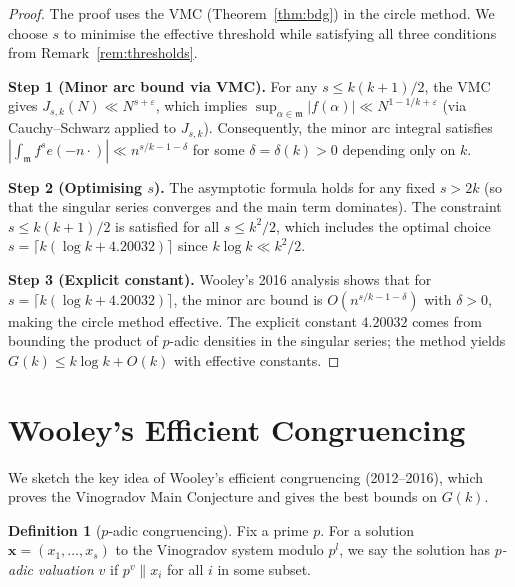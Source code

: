 \documentclass[12pt,a4paper]{amsart}
\theoremstyle{definition}
\newtheorem{definition}[theorem]{Definition}
\begin{document}
\begin{proof}
  The proof uses the VMC (Theorem~\ref{thm:bdg}) in the circle method.
  We choose $s$ to minimise the effective threshold while satisfying all
  three conditions from Remark~\ref{rem:thresholds}.

  \textbf{Step 1 (Minor arc bound via VMC).}
  For any $s \leq k(k+1)/2$, the VMC gives
  $J_{s,k}(N) \ll N^{s+\varepsilon}$, which implies
  $\sup_{\alpha \in \mathfrak{m}} |f(\alpha)| \ll N^{1-1/k+\varepsilon}$
  (via Cauchy--Schwarz applied to $J_{s,k}$).  Consequently, the minor arc
  integral satisfies $|\int_{\mathfrak{m}} f^s e(-n\cdot)| \ll n^{s/k-1-\delta}$
  for some $\delta = \delta(k) > 0$ depending only on $k$.

  \textbf{Step 2 (Optimising $s$).}
  The asymptotic formula holds for any fixed $s > 2k$ (so that the
  singular series converges and the main term dominates).
  The constraint $s \leq k(k+1)/2$ is satisfied for all $s \leq k^2/2$,
  which includes the optimal choice $s = \lceil k(\log k + 4.20032)\rceil$
  since $k \log k \ll k^2/2$.

  \textbf{Step 3 (Explicit constant).}
  Wooley's 2016 analysis \cite{Wooley2016} shows that for
  $s = \lceil k(\log k + 4.20032)\rceil$, the minor arc bound is
  $O(n^{s/k-1-\delta})$ with $\delta > 0$, making the circle method effective.
  The explicit constant $4.20032$ comes from bounding the product of
  $p$-adic densities in the singular series; the method yields
  $G(k) \leq k\log k + O(k)$ with effective constants.
\end{proof}

\section{Wooley's Efficient Congruencing}
\label{sec:efficient}

We sketch the key idea of Wooley's efficient congruencing (2012--2016),
which proves the Vinogradov Main Conjecture and gives the best bounds on $G(k)$.

\begin{definition}[$p$-adic congruencing]
  Fix a prime $p$.  For a solution $\mathbf{x} = (x_1,\ldots,x_s)$ to
  the Vinogradov system modulo $p^l$, we say the solution has
  \emph{$p$-adic valuation} $v$ if $p^v \| x_i$ for all $i$ in some subset.
\end{definition}
\end{document}

